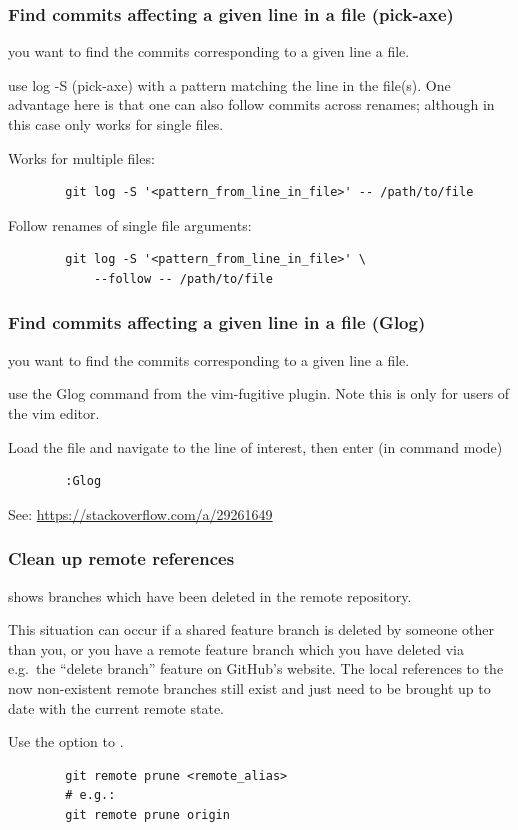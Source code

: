 \begin{frame}[fragile]
    \frametitle{Find commits affecting a given line in a file (pick-axe)}

     you want to find the commits corresponding to a given
    line a file.

     use log -S (pick-axe) with a pattern matching the line
    in the file(s).  One advantage here is that one can also follow commits
    across renames; although in this case only works for single files.

Works for multiple files:
    \begin{verbatim}
        git log -S '<pattern_from_line_in_file>' -- /path/to/file
    \end{verbatim}

Follow renames of single file arguments:
    \begin{verbatim}
        git log -S '<pattern_from_line_in_file>' \
            --follow -- /path/to/file
    \end{verbatim}

\end{frame}


\begin{frame}[fragile]
    \frametitle{Find commits affecting a given line in a file (Glog)}

     you want to find the commits corresponding to a given
    line a file.

     use the Glog command from the vim-fugitive plugin.  Note
    this is only for users of the vim editor.

    Load the file and navigate to the line of interest, then enter (in
    command mode)
    \begin{verbatim}
        :Glog
    \end{verbatim}

    See: \url{https://stackoverflow.com/a/29261649}
\end{frame}

\begin{frame}[fragile]
    \frametitle{Clean up remote references}

      shows branches which have been
    deleted in the remote repository.

    This situation can occur if a shared feature branch is deleted by
    someone other than you, or you have a remote feature branch which you
    have deleted via e.g.\ the ``delete branch'' feature on GitHub's website.
    The local references to the now non-existent remote branches still exist
    and just need to be brought up to date with the current remote state.

     Use the  option to .

    \begin{verbatim}
        git remote prune <remote_alias>
        # e.g.:
        git remote prune origin
    \end{verbatim}
\end{frame}

